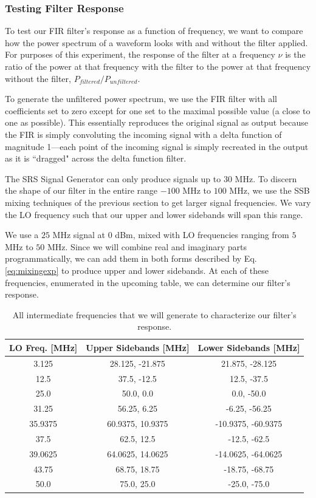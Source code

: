 \documentclass[12pt]{article}
\begin{document}
\subsubsection{Testing Filter Response}
To test our FIR filter's response as a function of frequency, we want to compare how the power spectrum of a waveform looks with and without the filter applied. For purposes of this experiment, the response of the filter at a frequency $\nu$ is the ratio of the power at that frequency with the filter to the power at that frequency without the filter, $P_{filtered}/P_{unfiltered}$.

To generate the unfiltered power spectrum, we use the FIR filter with all coefficients set to zero except for one set to the maximal possible value (a close to one as possible). This essentially reproduces the original signal as output because the FIR is simply convoluting the incoming signal with a delta function of magnitude 1---each point of the incoming signal is simply recreated in the output as it is ``dragged" across the delta function filter.

The SRS Signal Generator can only produce signals up to $30$ MHz. To discern the shape of our filter in the entire range $-100$ MHz to $100$ MHz, we use the SSB mixing techniques of the previous section to get larger signal frequencies. We vary the LO frequency such that our upper and lower sidebands will span this range.

We use a $25$ MHz signal at $0$ dBm, mixed with LO frequencies ranging from $5$ MHz to $50$ MHz. Since we will combine real and imaginary parts programmatically, we can add them in both forms described by Eq. \ref{eq:mixingexp} to produce upper and lower sidebands. At each of these frequencies, enumerated in the upcoming table, we can determine our filter's response.

\begin{table}
\begin{center}
  \begin{tabular}{c | c | c }
    LO Freq. [MHz] & Upper Sidebands [MHz] & Lower Sidebands [MHz] \\ \hline
    3.125 & 28.125, -21.875 & 21.875, -28.125 \\
    12.5 & 37.5, -12.5 & 12.5, -37.5 \\
    25.0 & 50.0, 0.0 & 0.0, -50.0 \\
    31.25 & 56.25, 6.25 & -6.25, -56.25 \\
    35.9375 & 60.9375, 10.9375 & -10.9375, -60.9375 \\
    37.5 & 62.5, 12.5 & -12.5, -62.5 \\
    39.0625 & 64.0625, 14.0625 & -14.0625, -64.0625 \\
    43.75 & 68.75, 18.75 & -18.75, -68.75 \\
    50.0 & 75.0, 25.0 & -25.0, -75.0 \\
    \end{tabular}
\end{center}
\caption{All intermediate frequencies that we will generate to characterize our filter's response.}
\label{tbl:firfrequencies}
\end{table}
\end{document}
